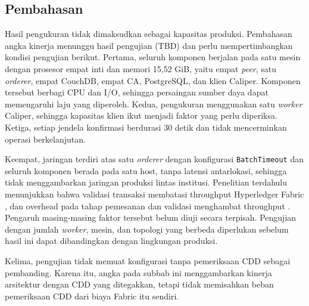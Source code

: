 \subsection{Pembahasan}

Hasil pengukuran tidak dimaksudkan sebagai kapasitas produksi. Pembahasan angka kinerja menunggu hasil pengujian (TBD) dan perlu mempertimbangkan kondisi pengujian berikut.
Pertama, seluruh komponen berjalan pada satu mesin dengan prosesor empat inti dan memori 15,52 GiB, yaitu empat \textit{peer}, satu \textit{orderer}, empat CouchDB, empat CA, PostgreSQL, dan klien Caliper. Komponen tersebut berbagi CPU dan I/O, sehingga persaingan sumber daya dapat memengaruhi laju yang diperoleh. Kedua, pengukuran menggunakan satu \textit{worker} Caliper, sehingga kapasitas klien ikut menjadi faktor yang perlu diperiksa. Ketiga, setiap jendela konfirmasi berdurasi 30 detik dan tidak mencerminkan operasi berkelanjutan.

Keempat, jaringan terdiri atas satu \textit{orderer} dengan konfigurasi \texttt{BatchTimeout} dan seluruh komponen berada pada satu host, tanpa latensi antarlokasi, sehingga tidak menggambarkan jaringan produksi lintas institusi. Penelitian terdahulu menunjukkan bahwa validasi transaksi membatasi throughput Hyperledger Fabric \cite{thakkar2018}, dan overhead pada tahap pemesanan dan validasi menghambat throughput \cite{gorenflo2019fastfabric}. Pengaruh masing-masing faktor tersebut belum diuji secara terpisah. Pengujian dengan jumlah \textit{worker}, mesin, dan topologi yang berbeda diperlukan sebelum hasil ini dapat dibandingkan dengan lingkungan produksi.

Kelima, pengujian tidak memuat konfigurasi tanpa pemeriksaan CDD sebagai pembanding. Karena itu, angka pada subbab ini menggambarkan kinerja arsitektur dengan CDD yang ditegakkan, tetapi tidak memisahkan beban pemeriksaan CDD dari biaya Fabric itu sendiri.
